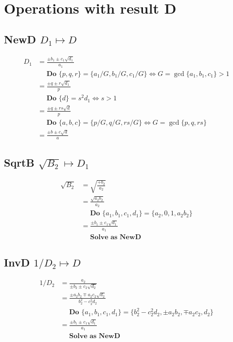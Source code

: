 \documentclass{article}
\begin{document}
\section{Operations with result D}

\subsection{NewD $D_1 \mapsto D $}
\begin{align}
D_1 &= \frac{\pm b_1 \pm c_1\sqrt{d_1}}{a_1}\\
 &\quad \textbf{ Do } \{p,q,r\} = \{a_1/G,b_1/G,c_1/G\} \iff G = \gcd \{a_1,b_1,c_1\} > 1 \nonumber \\
 &= \frac{\pm q \pm r\sqrt{d_1}}{p} \\
 &\quad \textbf{ Do } \{ d \} = s^2d_1 \iff s>1 \nonumber \\
 &= \frac{\pm q \pm rs\sqrt{d}}{p}\\
 &\quad \textbf{ Do } \{a,b,c\} = \{p/G,q/G,rs/G\} \iff G = \gcd \{p,q,rs\} \nonumber \\
 &= \frac{\pm b \pm c\sqrt{d}}{a}
\end{align}

\subsection{SqrtB $\sqrt{B_2} \mapsto D_1$}
\begin{align}
\sqrt{B_2} &= \sqrt{\frac{+b_2}{a_2}}\\
 &= \frac{\sqrt{a_2b_2}}{a_2}\\
 &\quad \textbf{ Do } \{ a_1, b_1, c_1, d_1\} = \{ a_2, 0, 1, a_2b_2\} \nonumber \\
 &= \frac{\pm b_1 \pm c_1\sqrt{d_1}}{a_1} \\
 &\quad \textbf{ Solve as NewD } \nonumber
\end{align}

\subsection{InvD $1 / D_2 \mapsto D$}
\begin{align*}
1 / D_2 &= \frac{a_2}{\pm b_2 \pm c_2\sqrt{d_2}} \\
 &= \frac{\pm a_2b_2 \mp a_2c_2\sqrt{d_2}}{b_2^2 - c_2^2d_2}\\
 &\quad \textbf{ Do } \{ a_1, b_1, c_1, d_1\} = \{ b_2^2 - c_2^2d_2, \pm a_2b_2, \mp a_2c_2, d_2\} \nonumber\\
 &= \frac{\pm b_1 \pm c_1\sqrt{d_1}}{a_1} \\
 &\quad \textbf{ Solve as NewD } \nonumber
\end{align*}
\end{document}
